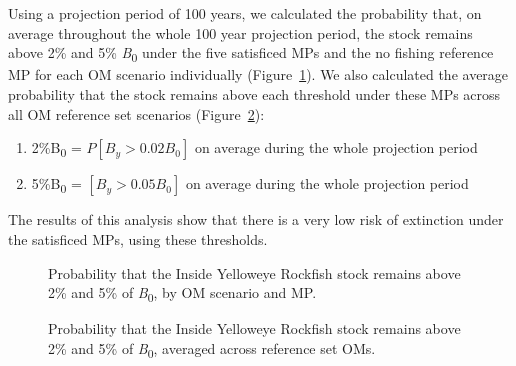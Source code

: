 \documentclass[11pt]{book}
\begin{document}
Using a projection period of 100 years, we calculated the probability that, on average throughout the whole 100 year projection period, the stock remains above 2\% and 5\% \emph{B}\textsubscript{0} under the five satisficed MPs and the no fishing reference MP for each OM scenario individually (Figure~\ref{fig:cosewic-all}). We also calculated the average probability that the stock remains above each threshold under these MPs across all OM reference set scenarios (Figure~\ref{fig:cosewic-avg}):
\begin{enumerate}
\def\labelenumi{\arabic{enumi}.}

\item
  2\%B\textsubscript{0} = \(P[B_y > 0.02 B_0]\) on average during the whole projection period
\item
  5\%B\textsubscript{0} = \([B_y > 0.05 B_0]\) on average during the whole projection period
\end{enumerate}
The results of this analysis show that there is a very low risk of extinction under the satisficed MPs, using these thresholds.


\begin{figure}[htb]

{\centering {} 

}

\caption{Probability that the Inside Yelloweye Rockfish stock remains above 2\% and 5\% of \emph{B}\textsubscript{0}, by OM scenario and MP.}\label{fig:cosewic-all}
\end{figure}
\clearpage


\begin{figure}[htb]

{\centering {} 

}

\caption{Probability that the Inside Yelloweye Rockfish stock remains above 2\% and 5\% of \emph{B}\textsubscript{0}, averaged across reference set OMs.}\label{fig:cosewic-avg}
\end{figure}
\clearpage


\clearpage

\hypertarget{computational-environment}{%
\label{computational-environment}}
\end{document}
